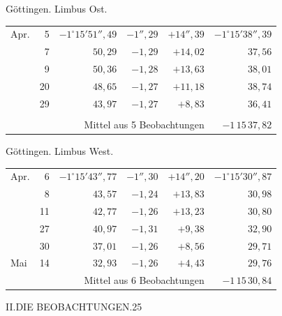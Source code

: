 \noindent\begin{minipage}[t]{.495\textwidth}\centering Göttingen. Limbus Ost.\par\smallskip
{\scriptsize\setlength{\tabcolsep}{1pt}\renewcommand{\arraystretch}{1.2}\begin{tabular}{lr|r|r|r|r|}
Apr.&5&$-1^\circ15'51''{,}49$&$-1''{,}29$&$+14''{,}39$&$-1^\circ15'38''{,}39$\\
&7&$50{,}29$&$-1{,}29$&$+14{,}02$&$37{,}56$\\
&9&$50{,}36$&$-1{,}28$&$+13{,}63$&$38{,}01$\\
&20&$48{,}65$&$-1{,}27$&$+11{,}18$&$38{,}74$\\
&29&$43{,}97$&$-1{,}27$&$+8{,}83$&$36{,}41$\\
&&&&&\\
\cline{6-6}\multicolumn{5}{r}{Mittel aus 5 Beobachtungen}&$-1\,15\,37{,}82$
\end{tabular}}\end{minipage}\hfill\begin{minipage}[t]{.495\textwidth}\centering Göttingen. Limbus West.\par\smallskip
{\scriptsize\setlength{\tabcolsep}{1pt}\renewcommand{\arraystretch}{1.2}\begin{tabular}{lr|r|r|r|r}
Apr.&6&$-1^\circ15'43''{,}77$&$-1''{,}30$&$+14''{,}20$&$-1^\circ15'30''{,}87$\\
&8&$43{,}57$&$-1{,}24$&$+13{,}83$&$30{,}98$\\
&11&$42{,}77$&$-1{,}26$&$+13{,}23$&$30{,}80$\\
&27&$40{,}97$&$-1{,}31$&$+9{,}38$&$32{,}90$\\
&30&$37{,}01$&$-1{,}26$&$+8{,}56$&$29{,}71$\\
Mai&14&$32{,}93$&$-1{,}26$&$+4{,}43$&$29{,}76$\\
\cline{6-6}\multicolumn{5}{r}{Mittel aus 6 Beobachtungen}&$-1\,15\,30{,}84$
\end{tabular}}\end{minipage}
\par\vspace{4mm}

\clearpage
\noindent\mbox{}\hfill II.\quad DIE BEOBACHTUNGEN.\hfill 25\par

